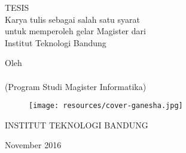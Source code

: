 \clearpage
\pagestyle{empty}

\begin{center}
\smallskip

    \singlespacing
    \large \bfseries \MakeUppercase{\thetitle}
    \vfill

    \large TESIS \\
    \bigskip
    \normalsize Karya tulis sebagai salah satu syarat\\
    untuk memperoleh gelar Magister dari\\
    Institut Teknologi Bandung
    \vfill

    \normalsize Oleh\\
    \large \theauthor\\
    (Program Studi Magister Informatika)


    \vfill
    \begin{figure}[h]
        \centering
      	\texttt{[image: resources/cover-ganesha.jpg]}
    \end{figure}
    \vfill

    \large
    \uppercase{
        Institut Teknologi Bandung
    }

    November 2016

\end{center}

\clearpage
